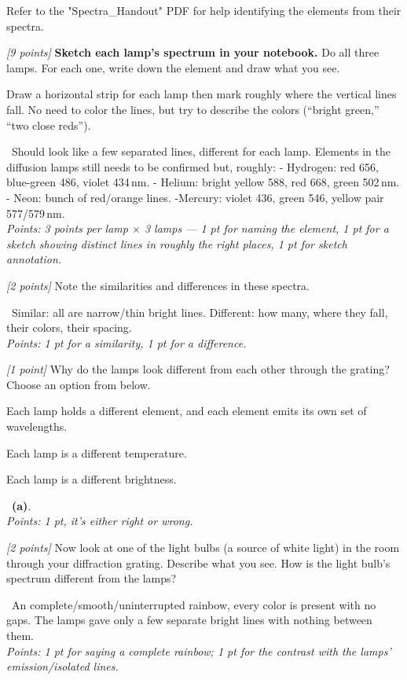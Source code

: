 \documentclass[11pt]{article}
\newenvironment{choices}
  {\begin{list}{}{%
     \setlength{\leftmargin}{2em}\setlength{\itemsep}{2pt}%
     \setlength{\topsep}{4pt}\setlength{\parsep}{0pt}}}
  {\end{list}}
\newcommand{\ch}[1]{\item[\textbf{(#1)}]}
\newcommand{\wlscale}{\hbox to \linewidth{\footnotesize
  400\hfill 450\hfill 500\hfill 550\hfill 600\hfill 650\hfill 700\,nm}}
\newcommand{\scaleref}{%
  \par\smallskip\noindent
  \fbox{\parbox[b][1.1cm][b]{0.96\textwidth}{\wlscale}}\par\smallskip}
\newcommand{\ans}[1]{%
  \par\smallskip\noindent{\color{blue!55!black}\textbf{Answer:}}\ #1\par\smallskip}
\begin{document}
Refer to the "Spectra\_Handout" PDF for help identifying the elements from their spectra.


\begin{enumerate}
    \item \textit{[9 points]} \textbf{Sketch each lamp's spectrum in your notebook.} Do all three
    lamps. For each one, write down the element and draw what you see.

    \smallskip
    Draw a horizontal strip for each lamp then mark roughly where the vertical lines fall. No need to color the lines, but try to describe the colors
    (``bright green,'' ``two close reds''). 

    \scaleref

    \ans{Should look like a few separated lines, different for each
    lamp. Elements in the diffusion lamps still needs to be confirmed but, roughly:
    - Hydrogen: red 656, blue-green 486, violet 434\,nm. - Helium: bright
    yellow 588, red 668, green 502\,nm.
    - Neon: bunch of red/orange lines.
    -Mercury: violet 436, green 546, yellow pair 577/579\,nm.
    \\[2pt]
    \emph{Points: 3 points per lamp $\times$ 3 lamps --- 1 pt for naming the element,
    1 pt for a sketch showing distinct lines in roughly the right places, 1 pt for sketch annotation.}}

    \item \textit{[2 points]} Note the similarities and differences in these spectra.

    \ans{Similar: all are narrow/thin bright lines. Different: how many,
    where they fall, their colors, their spacing.
    \\[2pt]
    \emph{Points: 1 pt for a similarity, 1 pt for a difference.}}

    \item \textit{[1 point]} Why do the lamps look different from each other through the grating? Choose an option from below.
    \begin{choices}
      \ch{a} Each lamp holds a different element, and each element emits its own
             set of wavelengths.
      \ch{b} Each lamp is a different temperature.
      \ch{c} Each lamp is a different brightness.
    \end{choices}

    \ans{\textbf{(a)}.
    \\[2pt]
    \emph{Points: 1 pt, it's either right or wrong.}}

    \item \textit{[2 points]} Now look at one of the light bulbs (a source of white light)
    in the room through your diffraction grating. Describe what you see. How is the light bulb's spectrum different from
    the lamps?

    \ans{An complete/smooth/uninterrupted rainbow, every color is present with no gaps. The lamps gave
    only a few separate bright lines with nothing between them.
    \\[2pt]
    \emph{Points: 1 pt for saying a complete rainbow; 1 pt for the
    contrast with the lamps' emission/isolated lines.}}
\end{enumerate}
\end{document}
